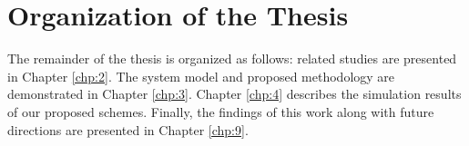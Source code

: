 \section{Organization of the Thesis}\hypertarget{organization of thesis}{}
The remainder of the thesis is organized as follows: related studies are presented in Chapter \ref{chp:2}. The system model and proposed methodology are demonstrated in Chapter \ref{chp:3}. Chapter \ref{chp:4} describes the simulation results of our proposed schemes. Finally, the findings of this work along with future directions are presented in Chapter \ref{chp:9}.

\clearpage
